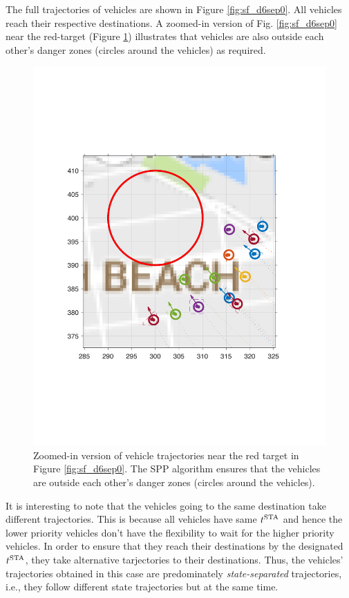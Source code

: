 The full trajectories of vehicles are shown in Figure \ref{fig:sf_d6sep0}. All vehicles reach their respective destinations. A zoomed-in version of Fig. \ref{fig:sf_d6sep0} near the red-target (Figure \ref{fig:sf_d6sep0_zoomed}) illustrates that vehicles are also outside each other's danger zones (circles around the vehicles) as required. 
%
\begin{figure}[H]
  \centering
  \includegraphics[width=\columnwidth]{"figs/sf_d6sep0_zoomed"}
  \caption{Zoomed-in version of vehicle trajectories near the red target in Figure \ref{fig:sf_d6sep0}. The SPP algorithm ensures that the vehicles are outside each other's danger zones (circles around the vehicles).} 
  \label{fig:sf_d6sep0_zoomed}
\end{figure}
It is interesting to note that the vehicles going to the same destination take different trajectories. This is because all vehicles have same $t^\text{STA}$ and hence the lower priority vehicles don't have the flexibility to wait for the higher priority vehicles. In order to ensure that they reach their destinations by the designated $t^\text{STA}$, they take alternative tarjectories to their destinations. Thus, the vehicles' trajectories obtained in this case are predominately \textit{state-separated} trajectories, i.e., they follow different state trajectories but at the same time. 

